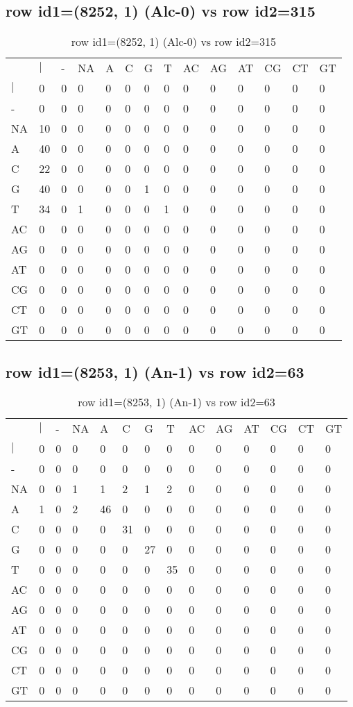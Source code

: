 \subsection{row id1=(8252, 1) (Alc-0) vs row id2=315}
\begin{center}
\begin{longtable}{|l|l|l|l|l|l|l|l|l|l|l|l|l|l|}
\caption{row id1=(8252, 1) (Alc-0) vs row id2=315} \label{table_dm192}\\
\hline
\\
\hline
&$|$&-&NA&A&C&G&T&AC&AG&AT&CG&CT&GT\\
$|$&0&0&0&0&0&0&0&0&0&0&0&0&0\\
-&0&0&0&0&0&0&0&0&0&0&0&0&0\\
NA&10&0&0&0&0&0&0&0&0&0&0&0&0\\
A&40&0&0&0&0&0&0&0&0&0&0&0&0\\
C&22&0&0&0&0&0&0&0&0&0&0&0&0\\
G&40&0&0&0&0&1&0&0&0&0&0&0&0\\
T&34&0&1&0&0&0&1&0&0&0&0&0&0\\
AC&0&0&0&0&0&0&0&0&0&0&0&0&0\\
AG&0&0&0&0&0&0&0&0&0&0&0&0&0\\
AT&0&0&0&0&0&0&0&0&0&0&0&0&0\\
CG&0&0&0&0&0&0&0&0&0&0&0&0&0\\
CT&0&0&0&0&0&0&0&0&0&0&0&0&0\\
GT&0&0&0&0&0&0&0&0&0&0&0&0&0\\
\hline
\end{longtable}
\end{center}

\subsection{row id1=(8253, 1) (An-1) vs row id2=63}
\begin{center}
\begin{longtable}{|l|l|l|l|l|l|l|l|l|l|l|l|l|l|}
\caption{row id1=(8253, 1) (An-1) vs row id2=63} \label{table_dm194}\\
\hline
\\
\hline
&$|$&-&NA&A&C&G&T&AC&AG&AT&CG&CT&GT\\
$|$&0&0&0&0&0&0&0&0&0&0&0&0&0\\
-&0&0&0&0&0&0&0&0&0&0&0&0&0\\
NA&0&0&1&1&2&1&2&0&0&0&0&0&0\\
A&1&0&2&46&0&0&0&0&0&0&0&0&0\\
C&0&0&0&0&31&0&0&0&0&0&0&0&0\\
G&0&0&0&0&0&27&0&0&0&0&0&0&0\\
T&0&0&0&0&0&0&35&0&0&0&0&0&0\\
AC&0&0&0&0&0&0&0&0&0&0&0&0&0\\
AG&0&0&0&0&0&0&0&0&0&0&0&0&0\\
AT&0&0&0&0&0&0&0&0&0&0&0&0&0\\
CG&0&0&0&0&0&0&0&0&0&0&0&0&0\\
CT&0&0&0&0&0&0&0&0&0&0&0&0&0\\
GT&0&0&0&0&0&0&0&0&0&0&0&0&0\\
\hline
\end{longtable}
\end{center}

